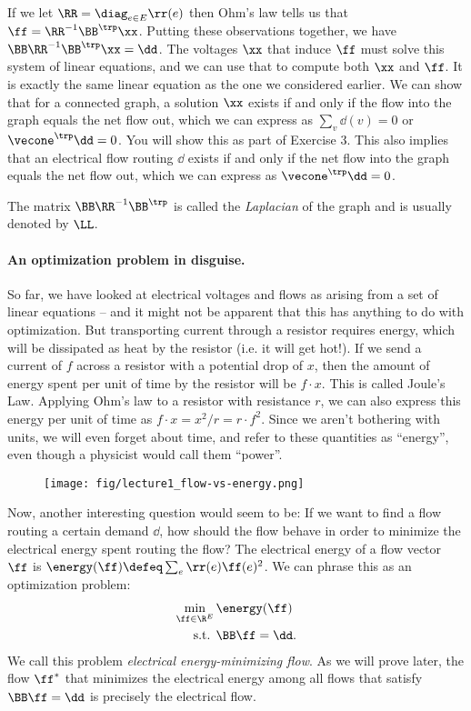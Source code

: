 If we let $\RR = \diag_{e \in E} \rr(e)$
then Ohm's law tells us that $\ff = \RR^{-1}\BB^{\trp} \xx$.
Putting these observations together, we have $\BB \RR^{-1}\BB^{\trp}
\xx= \dd$.
The voltages $\xx$ that induce $\ff$ must solve this system of linear
equations, and we can use that to compute both $\xx$ and $\ff$.
It is exactly the same linear
equation as the one we considered earlier.
We can show that for a connected graph, a solution $\xx$
exists if and only if the
flow into the graph equals the net flow out, which we can express as
$\sum_{v} \dd(v) = 0$ or $\vecone^\trp \dd = 0$.
You will show this as part of Exercise 3.
This also implies that an electrical flow routing
$\dd$ exists if and only if the net
flow into the graph equals the net flow out, which we can express as
$\vecone^\trp \dd = 0$.


The matrix $\BB \RR^{-1}\BB^{\trp}$ is called the \emph{Laplacian} of
the graph and is usually denoted by $\LL$.

\paragraph{An optimization problem in disguise.}
So far, we have looked at electrical voltages and flows as arising
from a set of linear equations -- and it might not be apparent that
this has anything to do with optimization.
But transporting current through a resistor requires energy, which will be
dissipated as heat by the resistor (i.e. it will get hot!).
If we send a current of $f$ across a resistor with a potential drop of
$x$, then the amount of energy spent per unit of time by the resistor will be
$f \cdot x$. This is called Joule's Law.
Applying Ohm's law to a resistor with resistance $r$,
we can also express this energy per unit of time
as $f \cdot x = x^2 / r = r \cdot f ^2$.
Since we aren't bothering with units, we will even forget about time,
and refer to these quantities as ``energy'', even though a physicist
would call them ``power''.

\begin{figure}[H]
  \centering
  \texttt{[image: fig/lecture1\_flow-vs-energy.png]}
  \label{fig:flow-vs-energy}
\end{figure}

Now, another interesting question would seem to be: If we want to find
a flow routing a certain demand $\dd$, how should the flow behave in
order to minimize the electrical energy spent routing the flow?
The electrical energy of a flow vector $\ff$ is $\energy(\ff) \defeq \sum_e \rr(e) \ff(e)^2$.
We can phrase this as an optimization problem:
\begin{align*}
  \min_{\ff \in \R^E} \, & \energy(\ff)
  \\
  \textrm{s.t. } & \BB \ff = \dd .
\end{align*}
We call this problem \emph{electrical energy-minimizing flow}.
As we will prove later, the flow $\ff^*$ that minimizes the electrical
energy among all flows that satisfy $\BB \ff = \dd$ is precisely the
electrical flow.

